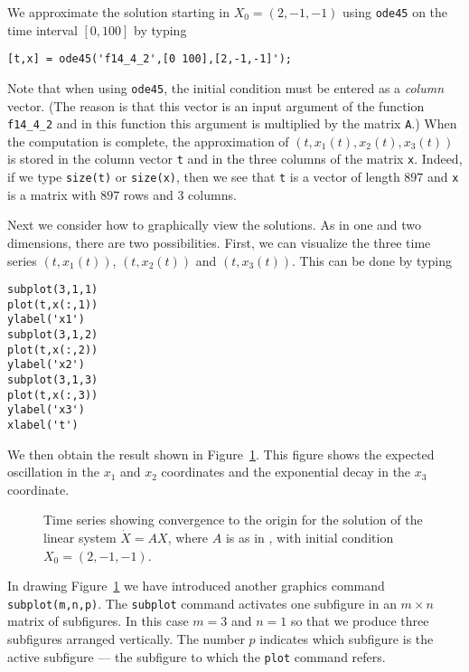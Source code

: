 \documentclass{ximera}
\begin{document}
We approximate the solution starting in $X_0=(2,-1,-1)$ using
{\tt ode45} on the time interval $[0,100]$ by typing
\begin{verbatim}
[t,x] = ode45('f14_4_2',[0 100],[2,-1,-1]');
\end{verbatim}
Note that when using {\tt ode45}, the 
initial condition must be entered 
as a {\em column\/} vector.   (The reason is that this vector is an
input argument of the function {\tt f14\_4\_2} and in this function
this argument is multiplied by the matrix {\tt A}.)  When the computation 
is complete, 
the approximation of $(t,x_1(t),x_2(t),x_3(t))$ is stored in the column 
vector {\tt t} and in the three columns of the matrix {\tt x}.  Indeed, if 
we type {\tt size(t)} or {\tt size(x)}, then we see that {\tt t} is a 
vector of length $897$ and {\tt x} is a matrix with $897$ rows and $3$ 
columns.  

Next we consider how to graphically view the solutions.  As in one and
two dimensions, there are two possibilities.  First, we can visualize 
the three time series 
$(t,x_1(t))$, $(t,x_2(t))$ and $(t,x_3(t))$.  
This can be done by typing
\begin{verbatim}
subplot(3,1,1)
plot(t,x(:,1))
ylabel('x1')
subplot(3,1,2)
plot(t,x(:,2))
ylabel('x2')
subplot(3,1,3)
plot(t,x(:,3))
ylabel('x3')
xlabel('t')
\end{verbatim}
We then obtain the result shown in Figure~\ref{fig:flinear1}.  This figure 
shows the expected oscillation in the $x_1$ and $x_2$ coordinates and the 
exponential decay in the $x_3$ coordinate.
\begin{figure}[htb]
   \centerline{%
   }
   \caption{Time series showing convergence to the origin for the solution 
	of the linear system $\dot X=AX$, where $A$ is as in 
	\protect{}, with initial condition $X_0=(2,-1,-1)$.}
   \label{fig:flinear1}
\end{figure}

In drawing Figure~\ref{fig:flinear1} we have introduced another \Matlab 
graphics command {\tt subplot(m,n,p)}.  
The {\tt subplot} command activates one 
subfigure in an $m\times n$ matrix of subfigures.  In this case $m=3$ 
and $n=1$ so that we produce three subfigures arranged vertically.  
The number $p$ indicates which subfigure is the active subfigure --- the 
subfigure to which the {\tt plot} command refers.
\end{document}
